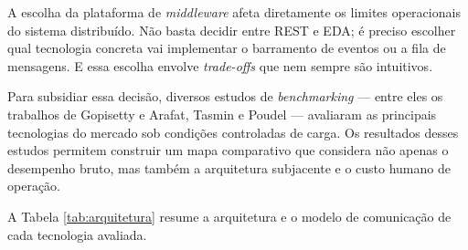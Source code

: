 \documentclass[12pt, a4paper]{article}
\begin{document}
A escolha da plataforma de \textit{middleware} afeta diretamente os limites operacionais do sistema distribuído. Não basta decidir entre REST e EDA; é preciso escolher qual tecnologia concreta vai implementar o barramento de eventos ou a fila de mensagens. E essa escolha envolve \textit{trade-offs} que nem sempre são intuitivos.

Para subsidiar essa decisão, diversos estudos de \textit{benchmarking} --- entre eles os trabalhos de Gopisetty \cite{gopisetty2026} e Arafat, Tasmin e Poudel \cite{benchmarking2025} --- avaliaram as principais tecnologias do mercado sob condições controladas de carga. Os resultados desses estudos permitem construir um mapa comparativo que considera não apenas o desempenho bruto, mas também a arquitetura subjacente e o custo humano de operação.

A Tabela \ref{tab:arquitetura} resume a arquitetura e o modelo de comunicação de cada tecnologia avaliada.

\begin{table}[H]
\centering
\caption{Modelos de Comunicação e Arquitetura de Middlewares}
\label{tab:arquitetura}
\end{table}
\end{document}
